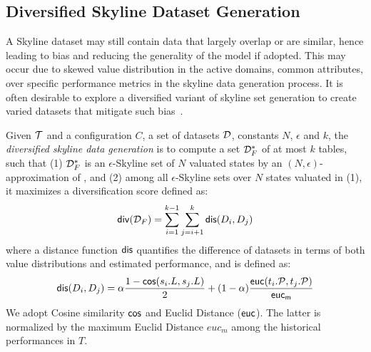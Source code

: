 \vspace{-1ex}
\subsection{Diversified Skyline Dataset Generation} 
\label{sec-divmodis}


A Skyline dataset may still contain data that largely overlap or are similar, hence leading to bias and reducing the generality of the model if adopted. 
This may occur due to skewed value distribution  %
in the active domains,  
common attributes, over
specific performance metrics in the skyline 
data generation process. %
It is often desirable to explore a diversified variant of skyline set generation to create varied datasets that mitigate such bias~\cite{konakovic2020diversity, low2023evolution}. 

Given ${\mathcal T}$ and a configuration $C$, a set of datasets ${\mathcal D}$, constants $N$, $\epsilon$ and $k$,  
the {\em diversified skyline data generation} 
is to compute a set ${\mathcal D}^*_F$ 
of at most $k$ tables, such that 
(1) ${\mathcal D}^*_F$ is an $\epsilon$-Skyline set 
of $N$ valuated states by an $(N, \epsilon)$-approximation of \modis, 
and (2) among all $\epsilon$-Skyline sets 
over $N$ states valuated in (1), it 
maximizes a diversification score 
defined as: 
\begin{equation}
{\ensuremath{\mathsf{div}}}({\mathcal D}_F) = \sum_{i=1}^{k-1} \sum_{j=i+1}^{k} {\mathsf{dis}}(D_i, D_j)
\label{eq:div}
\end{equation}
where a distance function ${\mathsf{dis}}$ quantifies   
the difference of datasets 
in terms of both value distributions and estimated performance, and is defined as:
\[{\mathsf{dis}}(D_i, D_j) = 
\alpha\frac{1-{\mathsf{cos}}(s_i.L, s_j.L)}{2}  + 
(1-\alpha)\frac{{\mathsf{euc}}(t_i.{\mathcal P}, t_j.{\mathcal P})}{{\mathsf{euc_{m}}}}\]
We adopt Cosine similarity ${\mathsf{cos}}$ 
and Euclid Distance (${\mathsf{euc}}$). 
The latter 
is normalized by the maximum Euclid Distance 
$euc_m$ among the historical performances in $T$. 

